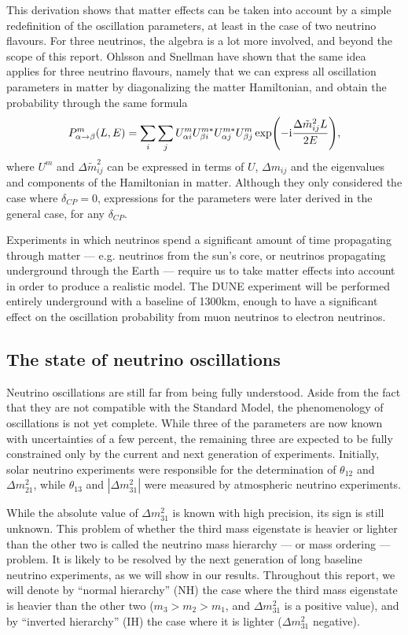 This derivation shows that matter effects can be taken into account by a simple
redefinition of the oscillation parameters, at least in the case of two
neutrino flavours. For three neutrinos, the algebra is a lot more involved, and
beyond the scope of this report. Ohlsson and Snellman\cite{ohlsson} have
shown that the same idea applies for three neutrino flavours, namely that we can
express all oscillation parameters in matter by diagonalizing the matter
Hamiltonian, and obtain the probability through the same formula
\begin{equation}
	P^m_{\alpha \rightarrow \beta}(L, E) = \sum_i \sum_j U^m_{\alpha i}
	U^{m*}_{\beta i} U^{m*}_{\alpha j} U^m_{\beta j} \exp(-\mathrm{i} \frac{\Delta
	\tilde{m}^2_{ij} L}{2 E}),
\end{equation}
where $U^m$ and $\Delta \tilde{m}^2_{ij}$ can be expressed in terms of $U$,
$\Delta m_{ij}$ and the eigenvalues and components of the Hamiltonian in
matter. Although they only considered the case where $\delta_{CP}=0$,
expressions for the parameters were later derived\cite{kneller} in the general
case, for any $\delta_{CP}$.

Experiments in which neutrinos spend a significant amount of time propagating
through matter --- e.g. neutrinos from the sun's core, or neutrinos propagating
underground through the Earth --- require us to take matter effects into
account in order to produce a realistic model. The DUNE experiment will be
performed entirely underground with a baseline of 1300km, enough to have a
significant effect on the oscillation probability from muon neutrinos to
electron neutrinos. 


\subsection{The state of neutrino oscillations}\label{sec:state}
Neutrino oscillations are still far from being fully understood. Aside from the
fact that they are not compatible with the Standard Model, the phenomenology of
oscillations is not yet complete. While three of the parameters are now known
with uncertainties of a few percent, the remaining three are expected to
be fully constrained only by the current and next generation of experiments.
Initially, solar neutrino experiments were responsible for the determination of
$\theta_{12}$ and $\Delta m^2_{21}$, while $\theta_{13}$ and $|\Delta m^2_{31}|$
were measured by atmospheric neutrino experiments\cite{barger}. 

While the absolute value of $\Delta m^2_{31}$ is known with high precision, its
sign is still unknown. This problem of whether the third mass eigenstate is
heavier or lighter than the other two is called the neutrino mass hierarchy ---
or mass ordering --- problem. It is likely to be resolved by the next
generation of long baseline neutrino experiments, as we will show in our results. 
Throughout this report, we will denote by ``normal hierarchy'' (NH) the case
where the third mass eigenstate is heavier than the other two ($m_3 > m_2 >
m_1$, and $\Delta m^2_{31}$ is a positive value), and by ``inverted hierarchy''
(IH) the case where it is lighter ($\Delta m^2_{31}$ negative).

